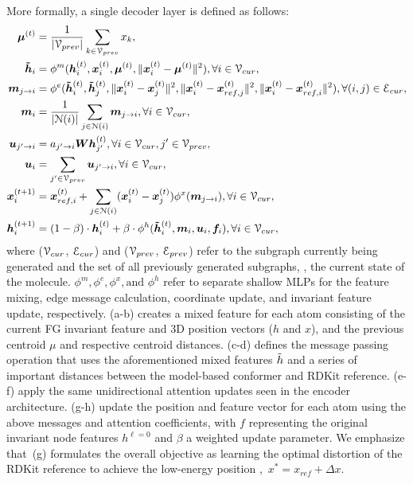 More formally, a single decoder layer is defined as follows:
\begin{subequations}
\begin{align}
\bm{\mu}^{(t)} &= \frac{1}{|{\mathcal{V}}_{prev}|} \sum_{k\in {\mathcal{V}}_{prev}}x_k, \\
\bm{\Tilde{h}}_{i} &= \phi^m(\bm{h}_i^{(t)},\bm{x}_i^{(t)},\bm{\mu}^{(t)},\lVert\bm{x}_i^{(t)}-\bm{\mu}^{(t)}\rVert^2),\forall i \in {\mathcal{V}}_{cur}, \\
\bm{m}_{j\to i} &= \phi^e(\bm{\Tilde{h}}_i^{(t)},\bm{\Tilde{h}}_j^{(t)},\lVert\bm{x}_i^{(t)}-\bm{x}_j^{(t)}\rVert^2,\lVert\bm{x}_i^{(t)}-\bm{x}_{ref, j}^{(t)}\rVert^2, \lVert\bm{x}_i^{(t)}-\bm{x}_{ref, i}^{(t)}\rVert^2),\forall (i,j)\in {\mathcal{E}}_{cur}, \\
\bm{m}_i &= \frac{1}{|{\mathcal{N}}(i)|} \sum_{j\in{\mathcal{N}}(i)}\bm{m}_{j\to i},\forall i\in{\mathcal{V}}_{cur}, \\
\bm{u}_{j'\to i} &= a_{j'\to i} \bm{W} \bm{h}_{j'}^{(t)},\forall i\in{\mathcal{V}}_{cur},j'\in{\mathcal{V}}_{prev}, \\
\bm{u}_{i} &=  \sum_{j'\in{\mathcal{V}}_{prev}}\bm{u}_{j'\to i},\forall i \in{\mathcal{V}}_{cur},\\
\bm{x}_i^{(t+1)} &= \bm{x}_{ref,i}^{(t)} + \sum_{j\in{\mathcal{N}}(i)} (\bm{x}_i^{(t)}-\bm{x}_j^{(t)})\phi^x(\bm{m}_{j\to i}),\forall i \in{\mathcal{V}}_{cur}, \\
\bm{h}_i^{(t+1)} &= (1 - \beta) \cdot \bm{h}_i^{(t)} + \beta \cdot \phi^h(\bm{\Tilde{h}}_i^{(t)},\bm{m}_i,\bm{u}_{i}, \bm{f}_i),\forall i\in{\mathcal{V}}_{cur},
\end{align}
\label{eqn:decoder}
\end{subequations}
where (${\mathcal{V}}_{cur}$, ${\mathcal{E}}_{cur}$) and (${\mathcal{V}}_{prev}$, ${\mathcal{E}}_{prev}$) refer to the subgraph currently being generated and the set of all previously generated subgraphs, \ie, the current state of the molecule. $\phi^m, \phi^e, \phi^x, \text{and } \phi^h$ refer to separate shallow MLPs for the feature mixing, edge message calculation, coordinate update, and invariant feature update, respectively. (a-b) creates a mixed feature for each atom consisting of the current FG invariant feature and 3D position vectors ($h$ and $x$), and the previous centroid $\mu$ and respective centroid distances. (c-d) defines the message passing operation that uses the aforementioned mixed features $\Tilde{h}$ and a series of important distances between the model-based conformer and RDKit reference.%
(e-f) apply the same unidirectional attention updates seen in the encoder architecture. (g-h) update the position and feature vector for each atom using the above messages and attention coefficients, with $f$ representing the original invariant node features $h^{\ell=0}$ and $\beta$ a weighted update parameter. We emphasize that~(g) formulates the overall objective as learning the optimal distortion of the RDKit reference to achieve the low-energy position \ie,\ $x^* = x_{ref} + \Delta x$.
